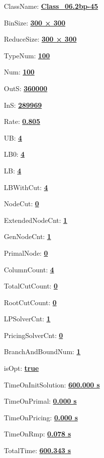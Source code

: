 \documentclass[11pt]{article}
\begin{document}
\pagestyle{empty}


ClassName: \underline{\textbf{Class_06.2bp-45}}
\par
BinSize: \underline{\textbf{300 × 300}}
\par
ReduceSize: \underline{\textbf{300 × 300}}
\par
TypeNum: \underline{\textbf{100}}
\par
Num: \underline{\textbf{100}}
\par
OutS: \underline{\textbf{360000}}
\par
InS: \underline{\textbf{289969}}
\par
Rate: \underline{\textbf{0.805}}
\par
UB: \underline{\textbf{4}}
\par
LB0: \underline{\textbf{4}}
\par
LB: \underline{\textbf{4}}
\par
LBWithCut: \underline{\textbf{4}}
\par
NodeCut: \underline{\textbf{0}}
\par
ExtendedNodeCnt: \underline{\textbf{1}}
\par
GenNodeCnt: \underline{\textbf{1}}
\par
PrimalNode: \underline{\textbf{0}}
\par
ColumnCount: \underline{\textbf{4}}
\par
TotalCutCount: \underline{\textbf{0}}
\par
RootCutCount: \underline{\textbf{0}}
\par
LPSolverCnt: \underline{\textbf{1}}
\par
PricingSolverCnt: \underline{\textbf{0}}
\par
BranchAndBoundNum: \underline{\textbf{1}}
\par
isOpt: \underline{\textbf{true}}
\par
TimeOnInitSolution: \underline{\textbf{600.000 s}}
\par
TimeOnPrimal: \underline{\textbf{0.000 s}}
\par
TimeOnPricing: \underline{\textbf{0.000 s}}
\par
TimeOnRmp: \underline{\textbf{0.078 s}}
\par
TotalTime: \underline{\textbf{600.343 s}}
\par
\newpage
\end{document}
